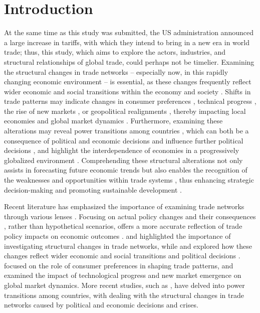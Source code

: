 \documentclass[preprint, 3p,
authoryear]{elsarticle} %
\begin{document}
\sloppy

\section{Introduction}\label{introduction}

At the same time as this study was submitted, the US administration
announced a large increase in tariffs, with which they intend to bring
in a new era in world trade; thus, this study, which aims to explore the
actors, industries, and structural relationships of global trade, could
perhaps not be timelier. Examining the structural changes in trade
networks \citep{james2001, he2010structure, guo2023impact} -- especially
now, in this rapidly changing economic environment -- is essential, as
these changes frequently reflect wider economic and social transitions
within the economy and society
\citep{stolte2021structural, mahutga2006persistence}. Shifts in trade
patterns may indicate changes in consumer preferences
\citep{janeba2007international}, technical progress
\citep{guerrieri1999technology, yi2021structural}, the rise of new
markets \citep{antonelli2002microdynamics, alamsyah2023rise}, or
geopolitical realignments \citep{barbieri2024geopolitics}, thereby
impacting local economies and global market dynamics
\citep{paolo2022, antonelli2002microdynamics}. Furthermore, examining
these alterations may reveal power transitions among countries
\citep{li2024evolutionary}, which can both be a consequence of political
and economic decisions \citep{kosztyan2024trade} and influence further
political decisions \citep{milner2017political}, and highlight the
interdependence of economies in a progressively globalized environment
\citep{kosztyan2024trade}. Comprehending these structural alterations
not only assists in forecasting future economic trends but also enables
the recognition of the weaknesses and opportunities within trade systems
\citep{sun2022influence}, thus enhancing strategic decision-making and
promoting sustainable development \citep{xu2025evolution}.

Recent literature has emphasized the importance of examining trade
networks through various lenses
\citep{xu2025evolution, li2024evolutionary}. Focusing on actual policy
changes and their consequences \citep{kosztyan2024trade}, rather than
hypothetical scenarios, offers a more accurate reflection of trade
policy impacts on economic outcomes
\citep{pinelopi2016, ortiz2021review}. \citet{he2010structure} and
\citet{guo2023impact} highlighted the importance of investigating
structural changes in trade networks, while \citet{stolte2021structural}
and \citet{mahutga2006persistence} explored how these changes reflect
wider economic and social transitions and political decisions
\citep{kosztyan2024trade}. \citet{janeba2007international} focused on
the role of consumer preferences in shaping trade patterns, and
\citet{antonelli2002microdynamics} examined the impact of technological
progress and new market emergence on global market dynamics. More recent
studies, such as \citet{li2024evolutionary}, have delved into power
transitions among countries, with \citet{kosztyan2024trade} dealing with
the structural changes in trade networks caused by political and
economic decisions and crises.
\end{document}

